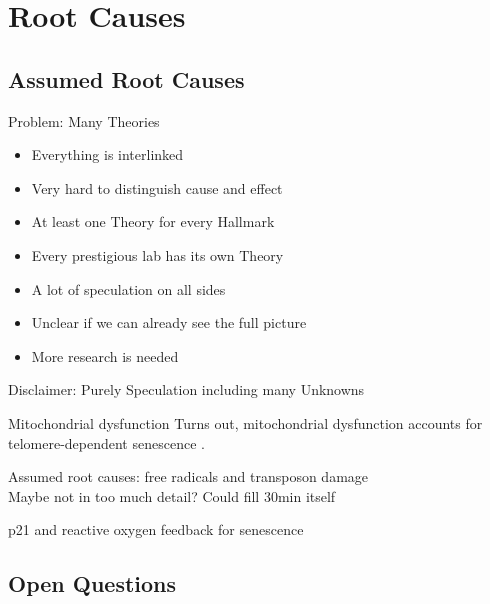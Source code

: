\section{Root Causes}
\subsection{Assumed Root Causes}

\begin{frame}[c]{Problem: Many Theories}
    \large
    \begin{itemize}[<+(1)->]
        \item Everything is interlinked
        \item Very hard to distinguish cause and effect
        \item At least one Theory for every Hallmark
        \item Every prestigious lab has its own Theory
        \item A lot of speculation on all sides
        \item Unclear if we can already see the full picture
        \item More research is needed
    \end{itemize}
\end{frame}

\addtocounter{framenumber}{1}
\begin{frame}[standout]
    Disclaimer: Purely Speculation including many Unknowns
\end{frame}

\begin{frame}[c]{Mitochondrial dysfunction}
    \large
    Turns out, mitochondrial dysfunction accounts for telomere-dependent senescence \cite{passos2007mitochondrial}.
\end{frame}


\begin{frame}[c]
    \large
    Assumed root causes: free radicals and transposon damage \\
    Maybe not in too much detail? Could fill 30min itself \cite{CorePath13:online} \\
    \pause

    p21 and reactive oxygen feedback for senescence \cite{passos2010feedback}
\end{frame}



\subsection{Open Questions}


